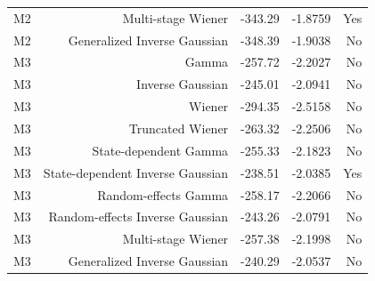 \begin{table}[t]
\begin{tabular}{lrrrr}
M2 & Multi-stage Wiener & -343.29 & -1.8759 & Yes \\
M2 & Generalized Inverse Gaussian & -348.39 & -1.9038 & No \\
M3 & Gamma & -257.72 & -2.2027 & No \\
M3 & Inverse Gaussian & -245.01 & -2.0941 & No \\
M3 & Wiener & -294.35 & -2.5158 & No \\
M3 & Truncated Wiener & -263.32 & -2.2506 & No \\
M3 & State-dependent Gamma & -255.33 & -2.1823 & No \\
M3 & State-dependent Inverse Gaussian & -238.51 & -2.0385 & Yes \\
M3 & Random-effects Gamma & -258.17 & -2.2066 & No \\
M3 & Random-effects Inverse Gaussian & -243.26 & -2.0791 & No \\
M3 & Multi-stage Wiener & -257.38 & -2.1998 & No \\
M3 & Generalized Inverse Gaussian & -240.29 & -2.0537 & No \\
\bottomrule
\end{tabular}
\end{table}
